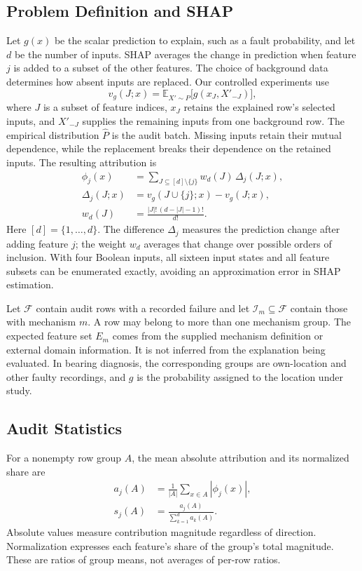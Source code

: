 \documentclass[conference]{IEEEtran}
\begin{document}
\subsection{Problem Definition and SHAP}
Let $g(x)$ be the scalar prediction to explain, such as a fault probability, and let $d$ be the number of inputs. SHAP averages the change in prediction when feature $j$ is added to a subset of the other features. The choice of background data determines how absent inputs are replaced. Our controlled experiments use
\begin{equation}
 v_g(J;x)=\mathbb E_{X'\sim\widehat P}\bigl[g(x_J,X'_{-J})\bigr],
 \label{eq:background}
\end{equation}
where $J$ is a subset of feature indices, $x_J$ retains the explained row's selected inputs, and $X'_{-J}$ supplies the remaining inputs from one background row. The empirical distribution $\widehat P$ is the audit batch. Missing inputs retain their mutual dependence, while the replacement breaks their dependence on the retained inputs. The resulting attribution is
\begin{align}
 \phi_j(x)&=\sum_{J\subseteq[d]\setminus\{j\}}w_d(J)\,\Delta_j(J;x),\label{eq:shap}\\
 \Delta_j(J;x)&=v_g(J\cup\{j\};x)-v_g(J;x),\\
 w_d(J)&=\frac{|J|!\,(d-|J|-1)!}{d!}.
\end{align}
Here $[d]=\{1,\ldots,d\}$. The difference $\Delta_j$ measures the prediction change after adding feature $j$; the weight $w_d$ averages that change over possible orders of inclusion. With four Boolean inputs, all sixteen input states and all feature subsets can be enumerated exactly, avoiding an approximation error in SHAP estimation.

Let $\mathcal F$ contain audit rows with a recorded failure and let $\mathcal I_m\subseteq\mathcal F$ contain those with mechanism $m$. A row may belong to more than one mechanism group. The expected feature set $E_m$ comes from the supplied mechanism definition or external domain information. It is not inferred from the explanation being evaluated. In bearing diagnosis, the corresponding groups are own-location and other faulty recordings, and $g$ is the probability assigned to the location under study.

\subsection{Audit Statistics}
For a nonempty row group $A$, the mean absolute attribution and its normalized share are
\begin{align}
 a_j(A)&=\frac{1}{|A|}\sum_{x\in A}|\phi_j(x)|,\label{eq:mean}\\
 s_j(A)&=\frac{a_j(A)}{\sum_{k=1}^{d}a_k(A)}.\label{eq:share}
\end{align}
Absolute values measure contribution magnitude regardless of direction. Normalization expresses each feature's share of the group's total magnitude. These are ratios of group means, not averages of per-row ratios.
\end{document}
